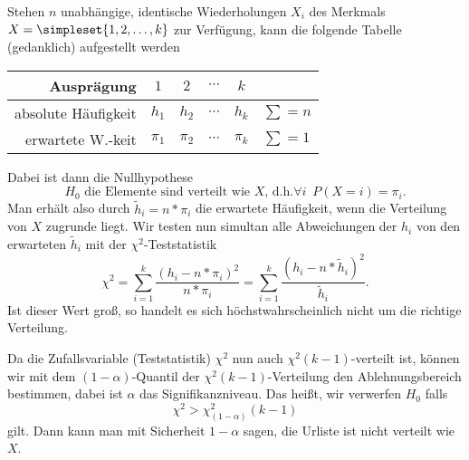 Stehen $n$ unabhängige, identische Wiederholungen $X_i$ des Merkmals $X=\simpleset{1,2,\ldots,k}$ zur Verfügung, kann die folgende Tabelle (gedanklich) aufgestellt werden
\begin{center}
	\begin{tabular}{r|cccc|l}
		Ausprägung&$1$&$2$&$\cdots$&$k$&\\\hline
		absolute Häufigkeit&$h_1$&$h_2$&$\cdots$&$h_k$&$\sum=n$\\
		erwartete W.-keit&$\pi_1$&$\pi_2$&$\cdots$&$\pi_k$&$\sum=1$
	\end{tabular}
\end{center}
Dabei ist dann die Nullhypothese 
\begin{equation*}
	H_0\text{ die Elemente sind verteilt wie $X$, d.h.} \forall i\enspace P(X=i)=\pi_i.
\end{equation*}
Man erhält also durch $\tilde h_i =n*\pi_i$ die erwartete Häufigkeit, wenn die Verteilung von $X$ zugrunde liegt.
Wir testen nun simultan alle Abweichungen der $h_i$ von den erwarteten $\tilde h_i$ mit der $\chi^2$-Teststatistik
\begin{equation*}
	\chi^2=\sum_{i=1}^k\frac{(h_i-n*\pi_i)^2}{n*\pi_i}=\sum_{i=1}^k\frac{(h_i-n*\tilde h_i)^2}{\tilde h_i}.
\end{equation*}
Ist dieser Wert groß, so handelt es sich höchstwahrscheinlich nicht um die richtige Verteilung.

Da die Zufallsvariable (Teststatistik) $\chi^2$ nun auch $\chi^2(k-1)$-verteilt ist, können wir mit dem $(1-\alpha)$-Quantil der $\chi^2(k-1)$-Verteilung den Ablehnungsbereich bestimmen, dabei ist $\alpha$ das Signifikanzniveau.
Das heißt, wir verwerfen $H_0$ falls
\begin{equation*}
	\chi^2>\chi^2_{(1-\alpha)}(k-1)
\end{equation*}
gilt. Dann kann man mit Sicherheit $1-\alpha$ sagen, die Urliste ist nicht verteilt wie $X$.

